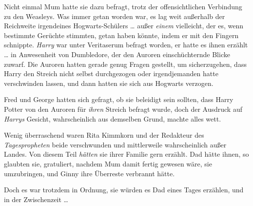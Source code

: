 Nicht einmal Mum hatte sie dazu befragt, trotz der offensichtlichen Verbindung zu den Weasleys. Was immer getan worden war, es lag weit außerhalb der Reichweite irgendeines Hogwarts-Schülers … außer \emph{einem} vielleicht, der es, wenn bestimmte Gerüchte stimmten, getan haben könnte, indem er mit den Fingern schnippte. \emph{Harry} war unter Veritaserum befragt worden, er hatte es ihnen erzählt … in Anwesenheit von Dumbledore, der den Auroren einschüchternde Blicke zuwarf. Die Auroren hatten gerade genug Fragen gestellt, um sicherzugehen, dass Harry den Streich nicht selbst durchgezogen oder irgendjemanden hatte verschwinden lassen, und dann hatten sie sich aus Hogwarts verzogen.

Fred und George hatten sich gefragt, ob sie beleidigt sein sollten, dass Harry Potter von den Auroren für \emph{ihren} Streich befragt wurde, doch der Ausdruck auf \emph{Harrys} Gesicht, wahrscheinlich aus demselben Grund, machte alles wett.

Wenig überraschend waren Rita Kimmkorn und der Redakteur des \emph{Tagespropheten} beide verschwunden und mittlerweile wahrscheinlich außer Landes. Von diesem Teil \emph{hätten} sie ihrer Familie gern erzählt. Dad hätte ihnen, so glaubten sie, gratuliert, nachdem Mum damit fertig gewesen wäre, sie umzubringen, und Ginny ihre Überreste verbrannt hätte.

Doch es war trotzdem in Ordnung, sie würden es Dad eines Tages erzählen, und in der Zwischenzeit …

